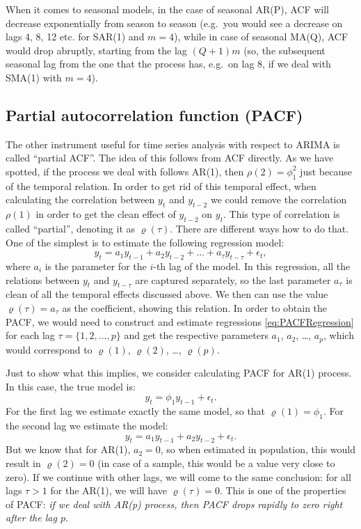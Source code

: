 \documentclass[
]{book}
\theoremstyle{definition}
\theoremstyle{definition}
\theoremstyle{definition}
\theoremstyle{definition}
\theoremstyle{remark}
\begin{document}
When it comes to seasonal models, in the case of seasonal AR(P), ACF will decrease exponentially from season to season (e.g.~you would see a decrease on lags 4, 8, 12 etc. for SAR(1) and \(m=4\)), while in case of seasonal MA(Q), ACF would drop abruptly, starting from the lag \((Q+1)m\) (so, the subsequent seasonal lag from the one that the process has, e.g.~on lag 8, if we deal with SMA(1) with \(m=4\)).

\hypertarget{PACF}{%
\subsection{Partial autocorrelation function (PACF)}\label{PACF}}

The other instrument useful for time series analysis with respect to ARIMA is called ``partial ACF''. The idea of this follows from ACF directly. As we have spotted, if the process we deal with follows AR(1), then \(\rho(2)=\phi_1^2\) just because of the temporal relation. In order to get rid of this temporal effect, when calculating the correlation between \(y_t\) and \(y_{t-2}\) we could remove the correlation \(\rho(1)\) in order to get the clean effect of \(y_{t-2}\) on \(y_t\). This type of correlation is called ``partial'', denoting it as \(\varrho(\tau)\). There are different ways how to do that. One of the simplest is to estimate the following regression model:
\begin{equation}
  y_t = a_1 y_{t-1} + a_2 y_{t-2} + \dots + a_\tau y_{t-\tau} + \epsilon_t,
  \label{eq:PACFRegression}
\end{equation}
where \(a_i\) is the parameter for the \(i\)-th lag of the model. In this regression, all the relations between \(y_t\) and \(y_{t-\tau}\) are captured separately, so the last parameter \(a_\tau\) is clean of all the temporal effects discussed above. We then can use the value \(\varrho(\tau) = a_\tau\) as the coefficient, showing this relation. In order to obtain the PACF, we would need to construct and estimate regressions \eqref{eq:PACFRegression} for each lag \(\tau=\{1, 2, \dots, p\}\) and get the respective parameters \(a_1\), \(a_2\), \ldots, \(a_p\), which would correspond to \(\varrho(1)\), \(\varrho(2)\), \ldots, \(\varrho(p)\).

Just to show what this implies, we consider calculating PACF for AR(1) process. In this case, the true model is:
\begin{equation*}
  y_t = \phi_1 y_{t-1} + \epsilon_t.
\end{equation*}
For the first lag we estimate exactly the same model, so that \(\varrho(1)=\phi_1\). For the second lag we estimate the model:
\begin{equation*}
  y_t = a_1 y_{t-1} + a_2 y_{t-2} + \epsilon_t.
\end{equation*}
But we know that for AR(1), \(a_2=0\), so when estimated in population, this would result in \(\varrho(2)=0\) (in case of a sample, this would be a value very close to zero). If we continue with other lags, we will come to the same conclusion: for all lags \(\tau>1\) for the AR(1), we will have \(\varrho(\tau)=0\). This is one of the properties of PACF: \emph{if we deal with AR(p) process, then PACF drops rapidly to zero right after the lag \(p\)}.
\end{document}
